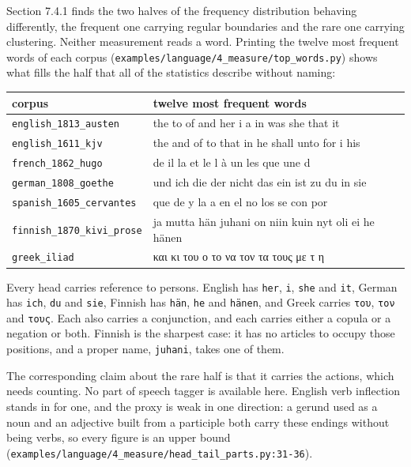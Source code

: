 Section 7.4.1 finds the two halves of the frequency distribution behaving differently, the frequent one carrying regular boundaries and the rare one carrying clustering. Neither measurement reads a word. Printing the twelve most frequent words of each corpus (\texttt{examples/\allowbreak{}language/\allowbreak{}4\_\allowbreak{}measure/\allowbreak{}top\_\allowbreak{}words.\allowbreak{}py}) shows what fills the half that all of the statistics describe without naming:

\tiny
\setlength{\tabcolsep}{2pt}
\begin{longtable}{@{}>{\raggedright\arraybackslash}p{}>{\raggedright\arraybackslash}p{}@{}}
\toprule
corpus & twelve most frequent words \\
\midrule
\texttt{english\_\allowbreak{}1813\_\allowbreak{}austen} & the to of and her i a in was she that it \\
\texttt{english\_\allowbreak{}1611\_\allowbreak{}kjv} & the and of to that in he shall unto for i his \\
\texttt{french\_\allowbreak{}1862\_\allowbreak{}hugo} & de il la et le l à un les que une d \\
\texttt{german\_\allowbreak{}1808\_\allowbreak{}goethe} & und ich die der nicht das ein ist zu du in sie \\
\texttt{spanish\_\allowbreak{}1605\_\allowbreak{}cervantes} & que de y la a en el no los se con por \\
\texttt{finnish\_\allowbreak{}1870\_\allowbreak{}kivi\_\allowbreak{}prose} & ja mutta hän juhani on niin kuin nyt oli ei he hänen \\
\texttt{greek\_\allowbreak{}iliad} & και κι του ο το να τον τα τους με τ η \\
\bottomrule
\end{longtable}
\normalsize

Every head carries reference to persons. English has \texttt{her}, \texttt{i}, \texttt{she} and \texttt{it}, German has \texttt{ich}, \texttt{du} and \texttt{sie}, Finnish has \texttt{hän}, \texttt{he} and \texttt{hänen}, and Greek carries \texttt{του}, \texttt{τον} and \texttt{τους}. Each also carries a conjunction, and each carries either a copula or a negation or both. Finnish is the sharpest case: it has no articles to occupy those positions, and a proper name, \texttt{juhani}, takes one of them.

The corresponding claim about the rare half is that it carries the actions, which needs counting. No part of speech tagger is available here. English verb inflection stands in for one, and the proxy is weak in one direction: a gerund used as a noun and an adjective built from a participle both carry these endings without being verbs, so every figure is an upper bound (\texttt{examples/\allowbreak{}language/\allowbreak{}4\_\allowbreak{}measure/\allowbreak{}head\_\allowbreak{}tail\_\allowbreak{}parts.\allowbreak{}py:31-\allowbreak{}36}).

